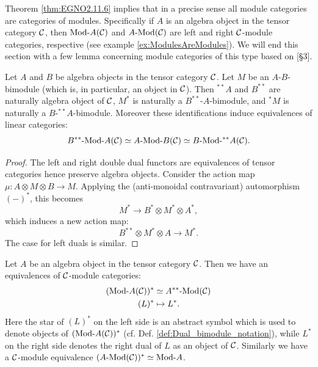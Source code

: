 \documentclass{amsart}
\begin{document}
Theorem \ref{thm:EGNO2.11.6} implies that in a precise sense all module categories are categories of modules. Specifically if $A$ is an algebra object in the tensor category $\mathcal C$, then $\Mod{}{A}(\cC)$ and $\Mod{A}{}(\cC)$ are left and right $\mathcal C$-module categories, respective (see example \ref{ex:ModulesAreModules}). We will end this section with a few lemma concerning module categories of this type based on \cite{0404504}[\S 3].

\begin{lemma}
	Let $A$ and $B$ be algebra objects in the tensor category $\mathcal C$. Let $M$ be an $A$-$B$-bimodule (which is, in particular, an object in $\mathcal C$). Then ${}^{**}A$ and $B^{**}$ are naturally algebra object of $\mathcal C$, $M^*$ is naturally a $B^{**}$-$A$-bimodule, and ${}^*M$ is naturally a $B$-${}^{**}A$-bimodule. Moreover these identifications induce equivalences of linear categories:
	\begin{equation*}
		\Mod{B^{**}}{A}(\cC) \simeq \Mod{A}{B}(\cC) \simeq \Mod{B}{{}^{**}A}(\cC).
	\end{equation*}
\end{lemma}

\begin{proof}
	The left and right double dual functors are equivalences of tensor categories hence preserve algebra objects. Consider the action map $\mu:A \otimes M \otimes B \to M$. Applying the (anti-monoidal contravariant) automorphism $(-)^*$, this becomes
	\begin{equation*}
		M^* \to B^* \otimes M^* \otimes A^*,
	\end{equation*}
	which induces a new action map:
	\begin{equation*}
		B^{**} \otimes M^* \otimes A \to M^*.
	\end{equation*}
	The case for left duals is similar. 
\end{proof}

\begin{lemma}
	Let $A$ be an algebra object in the tensor category $\mathcal C$. Then we have an equivalences of $\mathcal C$-module categories: 
	\begin{align*}
		(\Mod{}{A}(\cC))^* & \simeq \Mod{A^{**}}{}(\cC) \\
		(L)^* & \mapsto L^*.
	\end{align*}
	Here the star of $(L)^*$ on the left side is an abstract symbol which is used to denote objects of $(\Mod{}{A}(\cC))^*$ (cf. Def. \ref{def:Dual_bimodule_notation}), while $L^*$ on the right side denotes the right dual of $L$ as an object of $\mathcal C$. Similarly we have a $\mathcal C$-module equivalence $(\Mod{A}{}(\cC))^* \simeq \Mod{}{A}$.	
\end{lemma}
\end{document}
